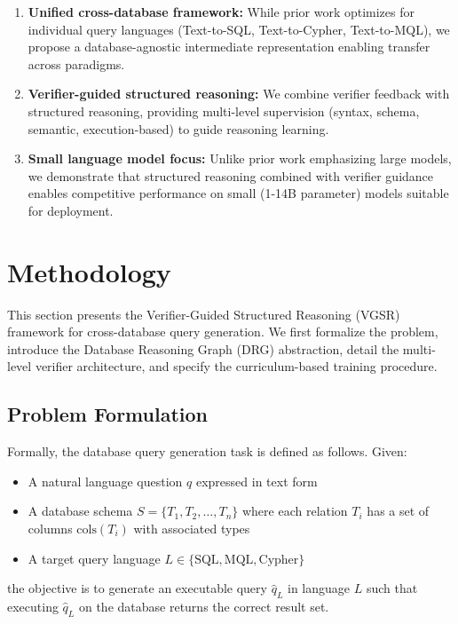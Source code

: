 \documentclass[conference]{IEEEtran}
\begin{document}
\begin{enumerate}
\item \textbf{Unified cross-database framework:} While prior work optimizes for individual query languages (Text-to-SQL, Text-to-Cypher, Text-to-MQL), we propose a database-agnostic intermediate representation enabling transfer across paradigms.

\item \textbf{Verifier-guided structured reasoning:} We combine verifier feedback with structured reasoning, providing multi-level supervision (syntax, schema, semantic, execution-based) to guide reasoning learning.

\item \textbf{Small language model focus:} Unlike prior work emphasizing large models, we demonstrate that structured reasoning combined with verifier guidance enables competitive performance on small (1-14B parameter) models suitable for deployment.
\end{enumerate}

\section{Methodology}
\label{sec:method}

This section presents the Verifier-Guided Structured Reasoning (VGSR) framework for cross-database query generation. We first formalize the problem, introduce the Database Reasoning Graph (DRG) abstraction, detail the multi-level verifier architecture, and specify the curriculum-based training procedure.

\subsection{Problem Formulation}

Formally, the database query generation task is defined as follows. Given:
\begin{itemize}
\item A natural language question $q$ expressed in text form
\item A database schema $S = \{T_1, T_2, \ldots, T_n\}$ where each relation $T_i$ has a set of columns $\text{cols}(T_i)$ with associated types
\item A target query language $L \in \{\text{SQL}, \text{MQL}, \text{Cypher}\}$
\end{itemize}

the objective is to generate an executable query $\hat{q}_L$ in language $L$ such that executing $\hat{q}_L$ on the database returns the correct result set.
\end{document}
